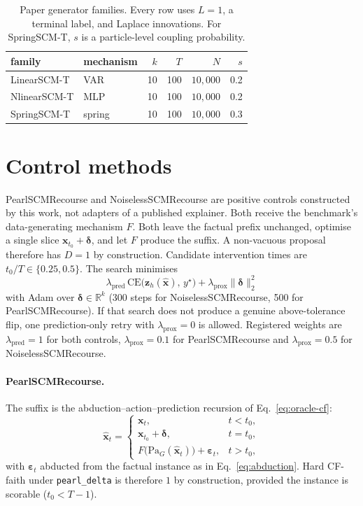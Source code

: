 \documentclass{article}
\newcommand{\R}{\mathbb{R}}
\newcommand{\bx}{\mathbf{x}}
\newcommand{\beps}{\boldsymbol{\varepsilon}}
\newcommand{\Pa}{\mathrm{Pa}}
\begin{document}
\begin{table}[h]
  \centering
  \small
  \caption{Paper generator families.  Every row uses $L=1$, a terminal label, and Laplace innovations.  For SpringSCM-T, $s$ is a particle-level coupling probability.}
  \label{tab:generator-families}
  \begin{tabular}{@{}llrrrr@{}}
    \toprule
    family & mechanism & $k$ & $T$ & $N$ & $s$ \\
    \midrule
    LinearSCM-T & VAR & 10 & 100 & $10{,}000$ & 0.2 \\
    NlinearSCM-T & MLP & 10 & 100 & $10{,}000$ & 0.2 \\
    SpringSCM-T & spring & 10 & 100 & $10{,}000$ & 0.3 \\
    \bottomrule
  \end{tabular}
\end{table}

\section{Control methods}
\label{app:controls}

PearlSCMRecourse and NoiselessSCMRecourse are positive controls constructed by this work, not adapters of a published explainer. Both receive the benchmark's data-generating mechanism $F$. Both leave the factual prefix unchanged, optimise a single slice $\bx_{t_0}+\boldsymbol{\delta}$, and let $F$ produce the suffix. A non-vacuous proposal therefore has $D=1$ by construction. Candidate intervention times are $t_0/T\in\{0.25,0.5\}$. The search minimises
\begin{equation}
  \lambda_{\mathrm{pred}}\,\mathrm{CE}\bigl(\mathbf{z}_h(\hat{\bx}),\,y^\star\bigr)
  +\lambda_{\mathrm{prox}}\lVert\boldsymbol{\delta}\rVert_2^2
\end{equation}
with Adam over $\boldsymbol{\delta}\in\R^k$ (300 steps for NoiselessSCMRecourse, 500 for PearlSCMRecourse).  If that search does not produce a genuine above-tolerance flip, one prediction-only retry with $\lambda_{\mathrm{prox}}=0$ is allowed.  Registered weights are $\lambda_{\mathrm{pred}}=1$ for both controls, $\lambda_{\mathrm{prox}}=0.1$ for PearlSCMRecourse and $\lambda_{\mathrm{prox}}=0.5$ for NoiselessSCMRecourse.

\paragraph{PearlSCMRecourse.}
The suffix is the abduction--action--prediction recursion of Eq.~\eqref{eq:oracle-cf}:
\begin{equation}
  \hat{\bx}_t
  =
  \begin{cases}
    \bx_t, & t<t_0,\\
    \bx_{t_0}+\boldsymbol{\delta}, & t=t_0,\\
    F\bigl(\Pa_G(\hat{\bx}_t)\bigr)+\beps_t, & t>t_0,
  \end{cases}
\end{equation}
with $\beps_t$ abducted from the factual instance as in Eq.~\eqref{eq:abduction}.  Hard CF-faith under \texttt{pearl\_delta} is therefore $1$ by construction, provided the instance is scorable ($t_0<T-1$).
\end{document}
